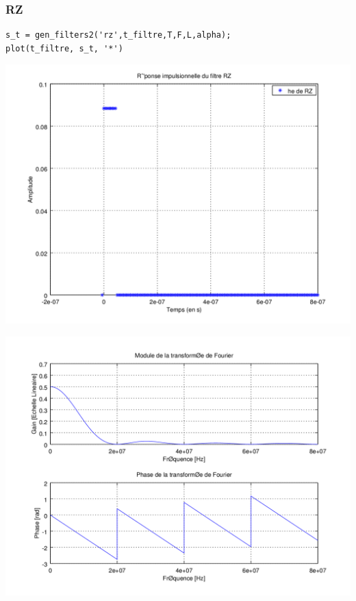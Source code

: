 \documentclass{acm_proc_article-sp}
\begin{document}
\subsubsection{RZ}

\begin{lstlisting}
s_t = gen_filters2('rz',t_filtre,T,F,L,alpha);
plot(t_filtre, s_t, '*')
\end{lstlisting}

\begin{center}
\includegraphics[scale=0.45]{RZ_3.png}
\end{center}

\begin{center}
\includegraphics[scale=0.45]{RZ_rep_3.png}
\end{center}
\end{document}
